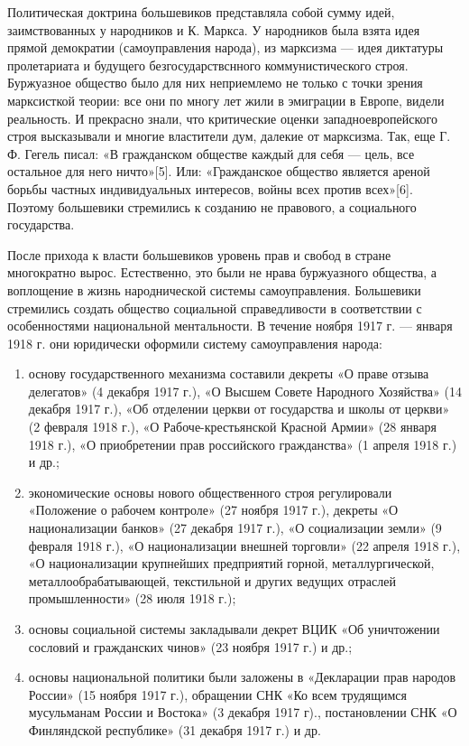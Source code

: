\documentclass{article}
\begin{document}
Политическая доктрина большевиков представляла собой сумму идей, заимствованных у народников и К. Маркса. У народников была взята идея прямой демократии (самоуправления народа), из марксизма — идея диктатуры пролетариата и будущего безгосударствснного коммунистического строя. Буржуазное общество было для них неприемлемо не только с точки зрения марксисткой теории: все они по многу лет жили в эмиграции в Европе, видели реальность. И прекрасно знали, что критические оценки западноевропейского строя высказывали и многие властители дум, далекие от марксизма. Так, еще Г. Ф. Гегель писал: «В гражданском обществе каждый для себя — цель, все остальное для него ничто»[5]. Или: «Гражданское общество является ареной борьбы частных индивидуальных интересов, войны всех против всех»[6]. Поэтому большевики стремились к созданию не правового, а социального государства.

\hfill

После прихода к власти большевиков уровень прав и свобод в стране многократно вырос. Естественно, это были не нрава буржуазного общества, а воплощение в жизнь народнической системы самоуправления. Большевики стремились создать общество социальной справедливости в соответствии с особенностями национальной ментальности. В течение ноября 1917 г. — января 1918 г. они юридически оформили систему самоуправления народа:

\begin{enumerate}
    \item основу государственного механизма составили декреты «О праве отзыва делегатов» (4 декабря 1917 г.), «О Высшем Совете Народного Хозяйства» (14 декабря 1917 г.), «Об отделении церкви от государства и школы от церкви» (2 февраля 1918 г.), «О Рабоче-крестьянской Красной Армии» (28 января 1918 г.), «О приобретении прав российского гражданства» (1 апреля 1918 г.) и др.;
    \item экономические основы нового общественного строя регулировали «Положение о рабочем контроле» (27 ноября 1917 г.), декреты «О национализации банков» (27 декабря 1917 г.), «О социализации земли» (9 февраля 1918 г.), «О национализации внешней торговли» (22 апреля 1918 г.), «О национализации крупнейших предприятий горной, металлургической, металлообрабатывающей, текстильной и других ведущих отраслей промышленности» (28 июля 1918 г.);
    \item основы социальной системы закладывали декрет ВЦИК «Об уничтожении сословий и гражданских чинов» (23 ноября 1917 г.) и др.;
    \item основы национальной политики были заложены в «Декларации прав народов России» (15 ноября 1917 г.), обращении СНК «Ко всем трудящимся мусульманам России и Востока» (3 декабря 1917 г)., постановлении СНК «О Финляндской республике» (31 декабря 1917 г.) и др.
\end{enumerate}
\end{document}
